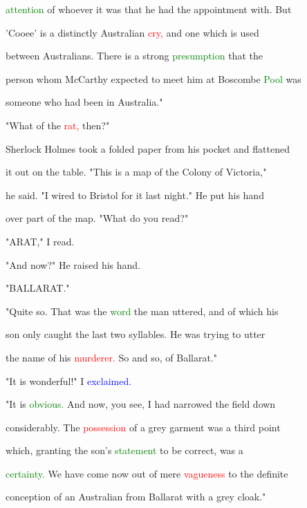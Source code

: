  \textcolor{green}{attention} of whoever it was that he had the appointment with. But

 'Cooee' is a distinctly Australian \textcolor{red}{cry,} and one which is used

 between Australians. There is a strong \textcolor{green}{presumption} that the

 person whom McCarthy \textcolor{BurntOrange}{expected} to meet him at Boscombe \textcolor{green}{Pool} was

 someone who had been in Australia."



 "What of the \textcolor{red}{rat,} then?"



 Sherlock Holmes took a folded paper from his pocket and flattened

 it out on the table. "This is a map of the Colony of Victoria,"

 he said. "I wired to Bristol for it last night." He put his hand

 over part of the map. "What do you read?"



 "ARAT," I read.



 "And now?" He raised his hand.



 "BALLARAT."



 "Quite so. That was the \textcolor{green}{word} the man uttered, and of which his

 son only caught the last two syllables. He was trying to utter

 the name of his \textcolor{red}{murderer.} So and so, of Ballarat."



 "It is \textcolor{BurntOrange}{wonderful!"} I \textcolor{blue}{exclaimed.}



 "It is \textcolor{green}{obvious.} And now, you see, I had narrowed the field down

 considerably. The \textcolor{red}{possession} of a grey garment was a third point

 which, \textcolor{BurntOrange}{granting} the son's \textcolor{green}{statement} to be correct, was a

 \textcolor{green}{certainty.} We have come now out of mere \textcolor{red}{vagueness} to the definite

 conception of an Australian from Ballarat with a grey cloak."



